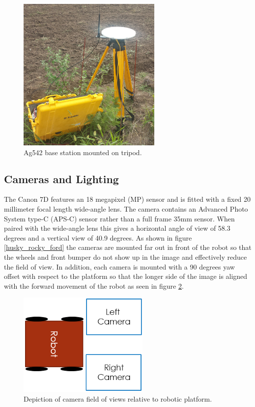 \begin{figure}[htb]
	\centering
    \includegraphics[height=3in]{figures/sunflower_base_cropped.jpg}
    \caption[Base station]{Ag542 base station mounted on tripod.}
    \label{base_station}
\end{figure}

\subsection{Cameras and Lighting}

The Canon 7D features an 18 megapixel (MP) sensor and is fitted with a fixed 20 millimeter focal length wide-angle lens.  The camera contains an Advanced Photo System type-C (APS-C) sensor rather than a full frame 35mm sensor. When paired with the wide-angle lens this gives a horizontal angle of view of 58.3 degrees and a vertical view of 40.9 degrees.  
As shown in figure \ref{husky_rocky_ford} the cameras are mounted far out in front of the robot so that the wheels and front bumper do not show up in the image and effectively reduce the field of view.  In addition, each camera is mounted with a 90 degrees yaw offset with respect to the platform so that the longer side of the image is aligned with the forward movement of the robot as seen in figure \ref{figure:image_fov}.  

\begin{figure}[htb]
	\centering
    \includegraphics[height=2in]{figures/camera_directions.png}
    \caption[Camera field of view]{Depiction of camera field of views relative to robotic platform.}
    \label{figure:image_fov}
\end{figure}

